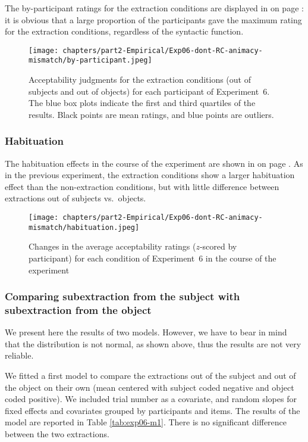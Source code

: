 The by-participant ratings for the extraction conditions are displayed in  on page \pageref{fig:exp06-byparticipant}: it is obvious that a large proportion of the participants gave the maximum rating for the extraction conditions, regardless of the syntactic function. 

\begin{figure}
    \centering
    \texttt{[image: chapters/part2-Empirical/Exp06-dont-RC-animacy-mismatch/by-participant.jpeg]}
    \caption{Acceptability judgments for the extraction conditions (out of subjects and out of objects) for each participant of Experiment~6. The blue box plots indicate the first and third quartiles of the results. Black points are mean ratings, and blue points are outliers.}
    \label{fig:exp06-byparticipant}
\end{figure}

\subsubsection{Habituation} 

The habituation effects in the course of the experiment are shown in  on page \pageref{fig:exp06-habituation}. As in the previous experiment, the extraction conditions show a larger habituation effect than the non-extraction conditions, but with little difference between extractions out of subjects vs.\ objects.

\begin{figure}
    \centering
    \texttt{[image: chapters/part2-Empirical/Exp06-dont-RC-animacy-mismatch/habituation.jpeg]}
    \caption{Changes in the average acceptability ratings ($z$-scored by participant) for each condition of Experiment~6 in the course of the experiment}
    \label{fig:exp06-habituation}
\end{figure}

\subsubsection{Comparing subextraction from the subject with subextraction from the object}

We present here the results of two models. However, we have to bear in mind that the distribution is not normal, as shown above, thus the results are not very reliable.

We fitted a first model to compare the extractions out of the subject and out of the object on their own (mean centered with subject coded negative and object coded positive). We included trial number as a covariate, and random slopes for fixed effects and covariates grouped by participants and items. The results of the model are reported in Table \ref{tab:exp06-m1}. There is no significant difference between the two extractions.

